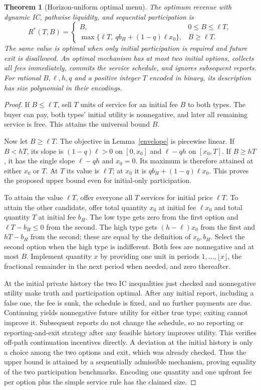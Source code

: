 \documentclass[11pt]{article}
\newtheorem{theorem}{Theorem}
\theoremstyle{remark}
\begin{document}
\begin{theorem}[Horizon-uniform optimal menu]\label{optimal}
The optimum revenue with dynamic IC, pathwise liquidity, and sequential
participation is
\[
 R^*(T,B)=
 \begin{cases}
 B,&0\leq B\leq\ell T,\\[2mm]
 \max\{\ell T,\ q b_H+(1-q)\ell x_0\},&B\geq\ell T.
 \end{cases}
\]
The same value is optimal when only initial participation is required
and future exit is disallowed. An optimal mechanism has at most two
initial options, collects all fees immediately, commits the service
schedule, and ignores subsequent reports. For rational $B,\ell,h,q$ and a positive integer $T$ encoded in binary,
its description has size polynomial in their encodings.
\end{theorem}
\begin{proof}
If $B\leq\ell T$, sell $T$ units of service for an initial fee $B$ to
both types. The buyer can pay, both types' initial utility is
nonnegative, and later all remaining service is free. This attains the
universal bound $B$.

Now let $B\geq\ell T$. The objective in Lemma~\ref{envelope} is
piecewise linear. If $B<hT$, its slope is $(1-q)\ell>0$ on
$[0,x_0]$ and $\ell-qh$ on $[x_0,T]$. If $B\geq hT$, it has the
single slope $\ell-qh$ and $x_0=0$. Its maximum is therefore attained
at either $x_0$ or $T$. At $T$ its value is $\ell T$; at $x_0$ it is
$q b_H+(1-q)\ell x_0$. This proves the proposed upper bound even for
initial-only participation.

To attain the value $\ell T$, offer everyone all $T$ services for
initial price $\ell T$. To attain the other candidate, offer total
quantity $x_0$ at initial fee $\ell x_0$ and total quantity $T$ at
initial fee $b_H$. The low type gets zero from the first option and
$\ell T-b_H\leq0$ from the second. The high type gets
$(h-\ell)x_0$ from the first and $hT-b_H$ from the second; these are
equal by the definition of $x_0,b_H$. Select the second option when the
high type is indifferent. Both fees are nonnegative and at most $B$.
Implement quantity $x$ by providing one unit in periods
$1,\ldots,\lfloor x\rfloor$, the fractional remainder in the next
period when needed, and zero thereafter.

At the initial private history the two IC inequalities just checked
and nonnegative utility make truth and participation optimal. After
any initial report, including a false one, the fee is sunk, the schedule
is fixed, and no further payments are due. Continuing yields
nonnegative future utility for either true type; exiting cannot improve
it. Subsequent reports do not change the schedule, so no reporting or
reporting-and-exit strategy after any feasible history improves utility.
This verifies off-path continuation incentives directly. A deviation at
the initial history is only a choice among the two options and exit,
which was already checked. Thus the upper bound is attained by a
sequentially admissible mechanism, proving equality of the two
participation benchmarks. Encoding one quantity and one upfront fee per
option plus the simple service rule has the claimed size.
\end{proof}
\end{document}
